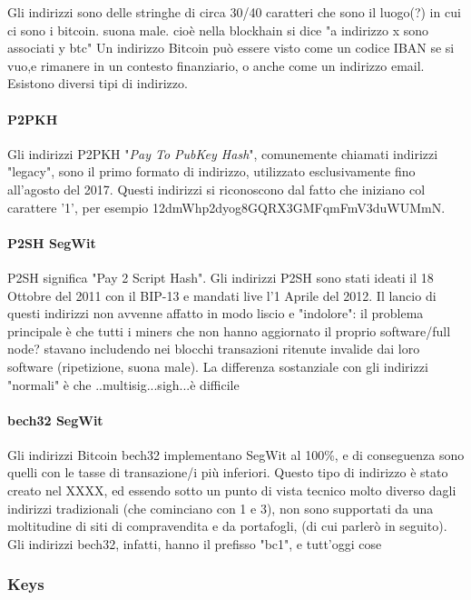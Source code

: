 \documentclass {article}
\begin{document}
Gli indirizzi sono delle stringhe di circa 30/40 caratteri che sono il luogo(?) in cui ci sono i bitcoin. suona male. cioè nella blockhain si dice "a indirizzo x sono associati y btc"
Un indirizzo Bitcoin può essere visto come un codice IBAN se si vuo,e rimanere in un contesto finanziario, o anche come un indirizzo email.
Esistono diversi tipi di indirizzo.


\paragraph {P2PKH}


Gli indirizzi P2PKH "\textit{Pay To PubKey Hash}", comunemente chiamati indirizzi "legacy", sono il primo formato di indirizzo, utilizzato esclusivamente fino all'agosto del 2017.
Questi indirizzi si riconoscono dal fatto che iniziano col carattere '1', per esempio 12dmWhp2dyog8GQRX3GMFqmFmV3duWUMmN. %


\paragraph {P2SH SegWit}


P2SH significa "Pay 2 Script Hash".
Gli indirizzi P2SH sono stati ideati il 18 Ottobre del 2011 con il BIP-13 e mandati live l'1 Aprile del 2012.
Il lancio di questi indirizzi non avvenne affatto in modo liscio e "indolore": il problema principale è che tutti i miners che non hanno aggiornato il proprio software/full node? stavano includendo nei blocchi transazioni ritenute invalide dai loro software (ripetizione, suona male).
La differenza sostanziale con gli indirizzi "normali" è che ..multisig...sigh...è difficile


\paragraph {bech32 SegWit}


Gli indirizzi Bitcoin bech32 implementano SegWit al 100\%, e di conseguenza sono quelli con le tasse di transazione/i più inferiori.
Questo tipo di indirizzo è stato creato nel XXXX, ed essendo sotto un punto di vista tecnico molto diverso dagli indirizzi tradizionali (che cominciano con 1 e 3), non sono supportati da una moltitudine di siti di compravendita e da portafogli, (di cui parlerò in seguito).
Gli indirizzi bech32, infatti, hanno il prefisso "bc1", e tutt'oggi cose

\subsubsection {Keys}
\end{document}
